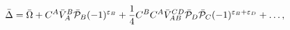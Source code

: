 \begin{equation}\label{4.4}
\bar{\Delta}=\bar{\Omega}+C^A\bar{V}_A^B\bar{\cal P}_B(-1)^{\varepsilon_B}+
\frac{1}{4}C^BC^A\bar{V}^{CD}_{AB}\bar{\cal P}_D\bar{\cal P}_C
(-1)^{\varepsilon_B+\varepsilon_D}+\ldots,
\end{equation}

